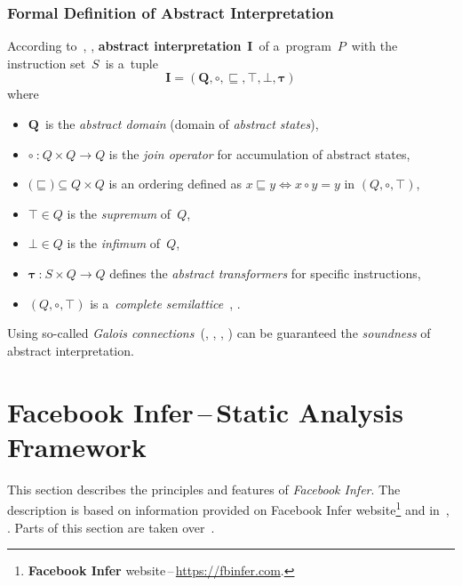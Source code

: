 \subsubsection*{Formal Definition of Abstract Interpretation}

According to~\cite{AILatticeModelCousot}, \cite{favAI},
\textbf{abstract interpretation}~$ \boldsymbol{I} $~of a~program~$ P $~with
the instruction set~$ S $~is a~tuple
$$ \boldsymbol{I = (Q, \circ, \sqsubseteq, \top, \bot, \tau)} $$
where
\begin{itemize}
    \item
        $ \boldsymbol{Q} $~is the \emph{abstract domain} (domain of
        \emph{abstract states}),

    \item
        $ \boldsymbol{\circ}~\text{:}~Q \times Q \rightarrow Q $ is the \emph{join
        operator} for accumulation of abstract states,

    \item
        $ \text{(}\boldsymbol{\sqsubseteq}\text{)} \subseteq Q \times Q $ is an
        ordering defined as $ x \sqsubseteq y \Leftrightarrow x \circ y = y $ in
        $ (Q, \circ, \top) $,

    \item
        $ \boldsymbol{\top} \in Q $ is the \emph{supremum} of~$ Q $,

    \item
        $ \boldsymbol{\bot} \in Q $ is the \emph{infimum} of~$ Q $,

    \item
        $ \boldsymbol{\tau}~\text{:}~S \times Q \rightarrow Q $
        defines the \emph{abstract transformers} for specific instructions,

    \item
        $ (Q, \circ, \top) $ is a~\emph{complete
        semilattice}~\cite{favLatticesAndFixpoints}, \cite{favAI}.
\end{itemize}
Using so-called \emph{Galois connections}~(\cite{programAnalysisNielson},
\cite{wideningNarrowingCousot}, \cite{favAI}, \cite{AICousotWeb}) can be
guaranteed the \emph{soundness} of abstract interpretation.


\section{\texorpdfstring{Facebook Infer\,--\,Static Analysis Framework}{}}
\label{sec:fbinfer}

This section describes the principles and features of
\emph{Facebook Infer}. The description is based on information provided 
on Facebook Infer website\footnote{\textbf{Facebook Infer}
website\,--\,\url{https://fbinfer.com}.} and in~\cite{inferAISlides},
\cite{projectPracticeMarcin2018}. Parts of this section are taken
over~\cite{excel2019FBInfer}.

